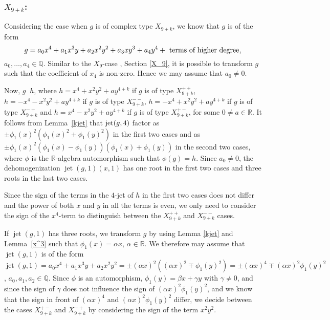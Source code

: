 \documentclass[noend]{amsproc}
\theoremstyle{definition}
\DeclareMathOperator{\requiv}{\overset{r}{\sim}}
\DeclareMathOperator{\jt}{jet}
\begin{document}
\subsubsection{$X_{9+k}$:}Considering the case when $g$ is of complex type $X_{9+k}$, we know that $g$ is
of the
form
\[
g=a_0x^4+a_1x^3y+a_2x^2y^2+a_3xy^3+a_4y^4+\textnormal{ terms of higher degree,}
\]
$a_0,\ldots,a_4\in\mathbb Q$.
Similar to the $X_9$-case , Section \ref{X_9}, it is possible to transform $g$ such that the coefficient of $x_4$ is non-zero. Hence we may assume that $a_0\neq 0$.

Now, $g\requiv h$, where $h=x^4+x^2y^2+ay^{4+k}$ if $g$ is of type
$X_{9+k}^{++}$, $h=-x^4-x^2y^2+ay^{4+k}$ if $g$ is of type $X_{9+k}^{--}$,
$h=-x^4+x^2y^2+ay^{4+k}$ if $g$ is of type $X_{9+k}^{-+}$ and
$h=x^4-x^2y^2+ay^{4+k}$ if $g$ is of type $X_{9+k}^{+-}$, for some
$0\neq a\in\mathbb R$.  It follows
from Lemma~\ref{kjet} that $\textnormal{jet}(g,4)$ factor as
$\pm\phi_1(x)^2(\phi_1(x)^2+\phi_1(y)^2)$ in the first two cases and as
$\pm\phi_1(x)^2(\phi_1(x)-\phi_1(y))(\phi_1(x)+\phi_1(y))$ in the second two
cases, where $\phi$ is the $\mathbb R$-algebra automorphism such that
$\phi(g)=h$. Since $a_0\neq 0$,  the dehomogenization $\jt(g,1)(x,1)$ has one
root in the first two
cases and
three roots in the last two cases.

Since the sign of the terms in the $4$-jet of $h$ in the first two cases
does not differ and the power of both $x$ and $y$ in all the terms is even,
we only need to consider the sign of the $x^4$-term to distinguish between
the $X_{9+k}^{++}$ and $X_{9+k}^{--}$ cases.

If $\jt(g,1)$ has three roots, we transform $g$ by using Lemma \ref{kjet}
and Lemma~\ref{x^3} such that $\phi_1(x)=\alpha x$, $\alpha\in\mathbb R$. We therefore may assume that
$\jt(g,1)$ is of the form
$\jt(g,1)=a_0x^4+a_1x^3y+a_2x^2y^2=\pm(\alpha x)^2((\alpha
x)^2\mp\phi_1(y)^2)=\pm(\alpha x)^4\mp (\alpha x)^2\phi_1(y)^2$,
$a_0,a_1,a_2\in\mathbb Q$. Since
$\phi$ is
an automorphism, $\phi_1(y)=\beta x+\gamma y$ with $\gamma \neq 0$,
and since the sign of $\gamma$ does not influence the sign of $(\alpha
x)^2\phi_1(y)^2$, and we know that the sign in front of $(\alpha x)^4$
and $(\alpha x)^2\phi_1(y)^2$ differ, we decide between the cases
$X_{9+k}^{+-}$ and $X_{9+k}^{-+}$ by considering the sign of the term $x^2y^2$.
\end{document}
